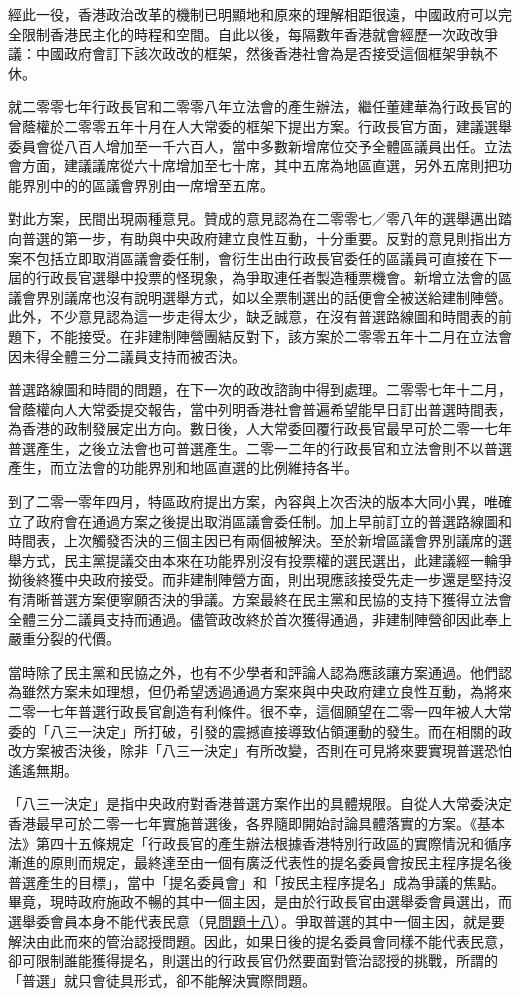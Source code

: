 經此一役，香港政治改革的機制已明顯地和原來的理解相距很遠，中國政府可以完全限制香港民主化的時程和空間。自此以後，每隔數年香港就會經歷一次政改爭議：中國政府會訂下該次政改的框架，然後香港社會為是否接受這個框架爭執不休。

就二零零七年行政長官和二零零八年立法會的產生辦法，繼任董建華為行政長官的曾蔭權於二零零五年十月在人大常委的框架下提出方案。行政長官方面，建議選舉委員會從八百人增加至一千六百人，當中多數新增席位交予全體區議員出任。立法會方面，建議議席從六十席增加至七十席，其中五席為地區直選，另外五席則把功能界別中的的區議會界別由一席增至五席。

對此方案，民間出現兩種意見。贊成的意見認為在二零零七／零八年的選舉邁出踏向普選的第一步，有助與中央政府建立良性互動，十分重要。反對的意見則指出方案不包括立即取消區議會委任制，會衍生出由行政長官委任的區議員可直接在下一屆的行政長官選舉中投票的怪現象，為爭取連任者製造種票機會。新增立法會的區議會界別議席也沒有說明選舉方式，如以全票制選出的話便會全被送給建制陣營。此外，不少意見認為這一步走得太少，缺乏誠意，在沒有普選路線圖和時間表的前題下，不能接受。在非建制陣營團結反對下，該方案於二零零五年十二月在立法會因未得全體三分二議員支持而被否決。

普選路線圖和時間的問題，在下一次的政改諮詢中得到處理。二零零七年十二月，曾蔭權向人大常委提交報告，當中列明香港社會普遍希望能早日訂出普選時間表，為香港的政制發展定出方向。數日後，人大常委回覆行政長官最早可於二零一七年普選產生，之後立法會也可普選產生。二零一二年的行政長官和立法會則不以普選產生，而立法會的功能界別和地區直選的比例維持各半。

到了二零一零年四月，特區政府提出方案，內容與上次否決的版本大同小異，唯確立了政府會在通過方案之後提出取消區議會委任制。加上早前訂立的普選路線圖和時間表，上次觸發否決的三個主因已有兩個被解決。至於新增區議會界別議席的選舉方式，民主黨提議交由本來在功能界別沒有投票權的選民選出，此建議經一輪爭拗後終獲中央政府接受。而非建制陣營方面，則出現應該接受先走一步還是堅持沒有清晰普選方案便寧願否決的爭議。方案最終在民主黨和民協的支持下獲得立法會全體三分二議員支持而通過。儘管政改終於首次獲得通過，非建制陣營卻因此奉上嚴重分裂的代價。

當時除了民主黨和民協之外，也有不少學者和評論人認為應該讓方案通過。他們認為雖然方案未如理想，但仍希望透過通過方案來與中央政府建立良性互動，為將來二零一七年普選行政長官創造有利條件。很不幸，這個願望在二零一四年被人大常委的「八三一決定」所打破，引發的震撼直接導致佔領運動的發生。而在相關的政改方案被否決後，除非「八三一決定」有所改變，否則在可見將來要實現普選恐怕遙遙無期。

「八三一決定」是指中央政府對香港普選方案作出的具體規限。自從人大常委決定香港最早可於二零一七年實施普選後，各界隨即開始討論具體落實的方案。《基本法》第四十五條規定「行政長官的產生辦法根據香港特別行政區的實際情況和循序漸進的原則而規定，最終達至由一個有廣泛代表性的提名委員會按民主程序提名後普選產生的目標」，當中「提名委員會」和「按民主程序提名」成為爭議的焦點。畢竟，現時政府施政不暢的其中一個主因，是由於行政長官由選舉委會員選出，而選舉委會員本身不能代表民意（見\hyperref[sec:sec18]{問題十八}）。爭取普選的其中一個主因，就是要解決由此而來的管治認授問題。因此，如果日後的提名委員會同樣不能代表民意，卻可限制誰能獲得提名，則選出的行政長官仍然要面對管治認授的挑戰，所謂的「普選」就只會徒具形式，卻不能解決實際問題。

